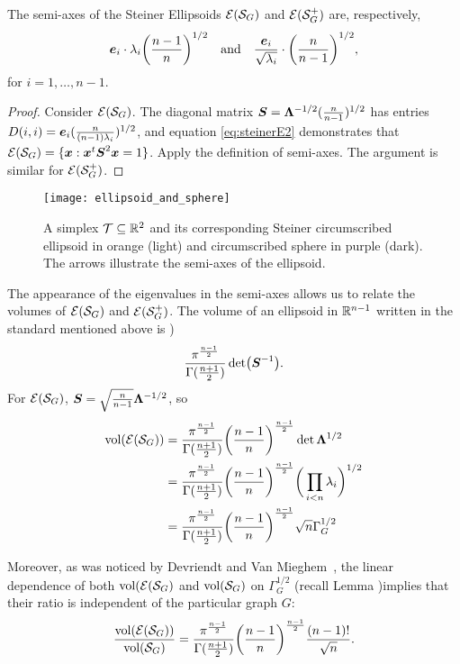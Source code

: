  \begin{lemma}
 	The semi-axes of the Steiner Ellipsoids  $\mathcal{E}(\mathcal{S}_G)$ and $\mathcal{E}(\mathcal{S}_G^+)$ are, respectively, 
 	\[\vb*{e}_i\cdot \lambda_i\bigg(\frac{n-1}{n}\bigg)^{1/2}\quad\text{and}\quad\frac{\vb*{e}_i}{\sqrt{\lambda_i} }\cdot \bigg(\frac{n}{n-1}\bigg)^{1/2}, \] 
 	for $i=1,\dots,n-1$. 
 \end{lemma}
\begin{proof}
	Consider $\mathcal{E}(\mathcal{S}_G)$. The diagonal matrix $\vb*{S}=\vb{\Lambda}^{-1/2} (\frac{n}{n-1})^{1/2}$ has entries $D(i,i) = \vb*{e}_i(\frac{n}{(n-1)\lambda_i})^{1/2}$, and equation  \eqref{eq:steinerE2} demonstrates  that  $\mathcal{E}(\mathcal{S}_G) = \{\vb*{x}:\vb*{x}^t \vb*{S}^2\vb*{x}=1\}$. Apply the definition of semi-axes. The argument is similar for $\mathcal{E}(\mathcal{S}_G^+)$. 
\end{proof}

\begin{figure}
	\centering
	\texttt{[image: ellipsoid\_and\_sphere]}
	\caption{A simplex $\mathcal{T}\subseteq\mathbb{R}^2$ and  its corresponding Steiner circumscribed ellipsoid in orange (light) and circumscribed sphere in purple (dark). The arrows illustrate the semi-axes of the ellipsoid.}
	\label{fig:ellipsoid_and_sphere}
\end{figure}

The appearance of the  eigenvalues  in  the semi-axes allows us to relate the volumes of $\mathcal{E}(\mathcal{S}_G)$ and $\mathcal{E}(\mathcal{S}_G^+)$.  The volume of an  ellipsoid in $\mathbb{R}^{n-1}$ written in the standard  mentioned  above is )
\begin{equation*}
\frac{\pi^{\frac{n-1}{2}}}{\Gamma(\frac{n+1}{2})} \det(\vb*{S}^{-1}). 
\end{equation*}
For $\mathcal{E}(\mathcal{S}_G)$, $\vb*{S} = \sqrt{\frac{n}{n-1}} \vb{\Lambda}^{-1/2}$, so 
\begin{align*}
\textnormal{vol}(\mathcal{E}(\mathcal{S}_G)) &= \frac{\pi^{\frac{n-1}{2}}}{\Gamma(\frac{n+1}{2})} \bigg(\frac{n-1}{n}\bigg)^{\frac{n-1}{2}} \det\vb{\Lambda}^{1/2} \\
&= \frac{\pi^{\frac{n-1}{2}}}{\Gamma(\frac{n+1}{2})} \bigg(\frac{n-1}{n}\bigg)^{\frac{n-1}{2}}\bigg(\prod_{i<n}\lambda_i\bigg)^{1/2} \\
&= \frac{\pi^{\frac{n-1}{2}}}{\Gamma(\frac{n+1}{2})} \bigg(\frac{n-1}{n}\bigg)^{\frac{n-1}{2}} \sqrt{n}\Gamma_G^{1/2}
\end{align*}

Moreover, as was noticed by Devriendt  and  Van Mieghem~\cite{devriendt2018simplex},  the linear dependence of both $\textnormal{vol}(\mathcal{E}(\mathcal{S}_G)$ and $\textnormal{vol}(\mathcal{S}_G)$ on $\Gamma_G^{1/2}$ (recall Lemma )implies that their ratio is independent of the particular graph $G$: 
\begin{equation*}
\frac{\textnormal{vol}(\mathcal{E}(\mathcal{S}_G))}{\textnormal{vol}(\mathcal{S}_G)} = \frac{\pi^{\frac{n-1}{2}}}{\Gamma(\frac{n+1}{2})} \bigg(\frac{n-1}{n}\bigg)^{\frac{n-1}{2}} \frac{(n-1)!}{\sqrt{n}}.
\end{equation*}

